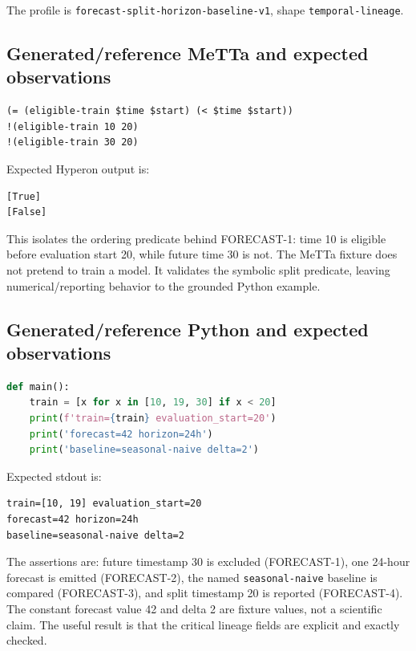\documentclass[11pt]{article}
\newcommand{\code}[1]{\texttt{#1}}
\begin{document}
The profile is \code{forecast-split-horizon-baseline-v1}, shape
\code{temporal-lineage}.

\subsection{Generated/reference MeTTa and expected observations}

\begin{lstlisting}[language={}]
(= (eligible-train $time $start) (< $time $start))
!(eligible-train 10 20)
!(eligible-train 30 20)
\end{lstlisting}

Expected Hyperon output is:

\begin{lstlisting}[language={}]
[True]
[False]
\end{lstlisting}

This isolates the ordering predicate behind FORECAST-1: time 10 is eligible
before evaluation start 20, while future time 30 is not.  The MeTTa fixture
does not pretend to train a model.  It validates the symbolic split predicate,
leaving numerical/reporting behavior to the grounded Python example.

\subsection{Generated/reference Python and expected observations}

\begin{lstlisting}[language=Python]
def main():
    train = [x for x in [10, 19, 30] if x < 20]
    print(f'train={train} evaluation_start=20')
    print('forecast=42 horizon=24h')
    print('baseline=seasonal-naive delta=2')
\end{lstlisting}

Expected stdout is:

\begin{lstlisting}[language={}]
train=[10, 19] evaluation_start=20
forecast=42 horizon=24h
baseline=seasonal-naive delta=2
\end{lstlisting}

The assertions are: future timestamp 30 is excluded (FORECAST-1), one 24-hour
forecast is emitted (FORECAST-2), the named \code{seasonal-naive} baseline is
compared (FORECAST-3), and split timestamp 20 is reported (FORECAST-4).
The constant forecast value 42 and delta 2 are fixture values, not a scientific
claim.  The useful result is that the critical lineage fields are explicit and
exactly checked.
\end{document}
